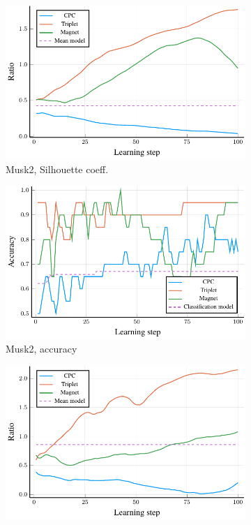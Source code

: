 \begin{figure}
  \centering
  \begin{subfigure}[t]{0.49\textwidth}
    \centering
    \includegraphics[width=\textwidth]{images/Musk2_ratio/Musk2_ratio.pdf}
    \caption{Musk2, Silhouette coeff.}
  \end{subfigure}
  \begin{subfigure}[t]{0.49\textwidth}
    \centering
    \includegraphics[width=\textwidth]{images/Musk2_accuracy/Musk2_accuracy.pdf}
    \caption{Musk2, accuracy}
  \end{subfigure}
  \begin{subfigure}[t]{0.49\textwidth}
    \centering
    \includegraphics[width=\textwidth]{images/UCSBBreastCancer_ratio/UCSBBreastCancer_ratio.pdf}

\end{subfigure}
\end{figure}
